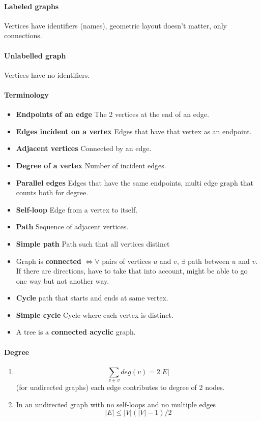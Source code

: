 \documentclass[12 pt]{article}
\theoremstyle{definition}
\begin{document}
        \paragraph{Labeled graphs} Vertices have identifiers (names), geometric layout doesn't matter, only connections.
        \paragraph{Unlabelled graph} Vertices have no identifiers.

\paragraph{Terminology}
\begin{itemize}
\item \textbf{Endpoints of an edge} The 2 vertices at the end of an edge.
\item \textbf{Edges incident on a vertex} Edges that have that vertex as an endpoint.
\item \textbf{Adjacent vertices} Connected by an edge.
\item \textbf{Degree of a vertex} Number of incident edges.
\item \textbf{Parallel edges} Edges that have the same endpoints, multi edge graph that counts both for degree.
\item \textbf{Self-loop} Edge from a vertex to itself.
\item \textbf{Path} Sequence of adjacent vertices.
\item \textbf{Simple path} Path such that all vertices distinct
\item Graph is \textbf{connected} $\iff \forall$ pairs of vertices $u$ and $v$, $\exists$ path between $u$ and $v$. If there are directions, have to take that into account, might be able to go one way but not another way.
\item \textbf{Cycle} path that starts and ends at same vertex.
\item \textbf{Simple cycle} Cycle where each vertex is distinct.
\item A tree is a \textbf{connected acyclic} graph.
\end{itemize}
\paragraph{Degree}
\begin{enumerate}
\item $$\sum_{v\in v }deg(v)=2|E|$$ (for undirected graphs) each edge contributes to degree of 2 nodes.
\item In an undirected graph with no self-loops and no multiple edges
  $$|E|\leq |V|(|V|-1)/2$$
\end{enumerate}
\end{document}
